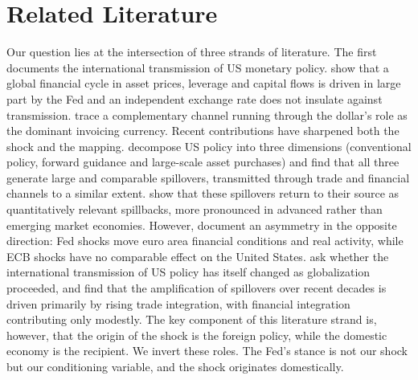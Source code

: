 \section{Related Literature}\label{sec:literature}

Our question lies at the intersection of three strands of literature. The first  documents the international transmission of US monetary policy. \citet{miranda2020us} show that a global financial cycle in asset prices, leverage and capital flows is driven in large part by the Fed and an independent exchange rate does not insulate against transmission. \citet{gopinath2021dominant} trace a complementary channel running through the dollar's role as the dominant invoicing currency. Recent contributions have sharpened both the shock and the mapping. \citet{gj2023global} decompose US policy into three dimensions (conventional policy, forward guidance and large-scale asset purchases) and find that all three generate large and comparable spillovers, transmitted through trade and financial channels to a similar extent. \citet{breitenlechner2021spillbacks} show that these spillovers return to their source as quantitatively relevant spillbacks, more pronounced in advanced rather than emerging market economies. However, \citet{ca2021making} document an asymmetry in the opposite direction: Fed shocks move euro area financial conditions and real activity, while ECB shocks have no comparable effect on the United States. \citet{boeck2025globalization} ask whether the international transmission of US policy has itself changed as globalization proceeded, and find that the amplification of spillovers over recent decades is driven primarily by rising trade integration, with financial integration contributing only modestly. The key component of this literature strand is, however, that the origin of the shock is the foreign policy, while the domestic economy is the recipient. We invert these roles. The Fed's stance is not our shock but our conditioning variable, and the shock originates domestically.

